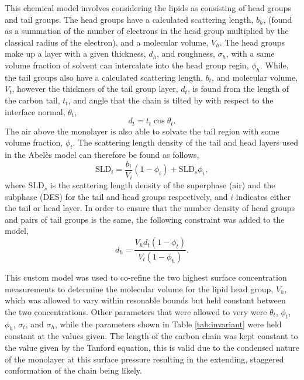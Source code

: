 \documentclass[twoside,twocolumn,9pt]{article}
\begin{document}
This chemical model involves considering the lipids as consisting of head groups and tail groups. The head groups have a calculated scattering length, $b_h$, (found as a summation of the number of electrons in the head group multiplied by the classical radius of the electron), and a molecular volume, $V_h$. The head groups make up a layer with a given thickness, $d_h$, and roughness, $\sigma_h$, with a same volume fraction of solvent can intercalate into the head group regin, $\phi_h$. While, the tail groups also have a calculated scattering length, $b_t$, and molecular volume, $V_t$, however the thickness of the tail group layer, $d_t$, is found from the length of the carbon tail, $t_t$, and angle that the chain is tilted by with respect to the interface normal, $\theta_t$, 
\begin{equation}
\label{equ:tl}
d_t = t_t \cos{\theta_t}.
\end{equation}
The air above the monolayer is also able to solvate the tail region with some volume fraction, $\phi_t$. The scattering length density of the tail and head layers used in the Abel\`{e}s model can therefore be found as follows, 
\begin{equation}
\text{SLD}_i = \frac{b_i}{V_i}(1 - \phi_i) + \text{SLD}_{s}\phi_i,
\end{equation}
where $\text{SLD}_{s}$ is the scattering length density of the superphase (air) and the subphase (DES) for the tail and head groups respectively, and $i$ indicates either the tail or head layer. In order to ensure that the number density of head groups and pairs of tail groups is the same, the following constraint was added to the model,
\begin{equation}
d_h = \frac{V_hd_t(1-\phi_t)}{V_t(1-\phi_h)}. 
\end{equation}

This custom model was used to co-refine the two highest surface concentration measurements to determine the molecular volume for the lipid head group, $V_h$, which was allowed to vary within resonable bounds but held constant between the two concentrations. Other parameters that were allowed to very were $\theta_t$, $\phi_t$, $\phi_h$, $\sigma_t$, and $\sigma_h$, while the parameters shown in Table \ref{tab:invariant} were held constant at the values given. The length of the carbon chain was kept constant to the value given by the Tanford equation,\cite{Tanford1980} this is valid due to the condensed nature of the monolayer at this surface pressure resulting in the extending, staggered conformation of the chain being likely. 
\end{document}
